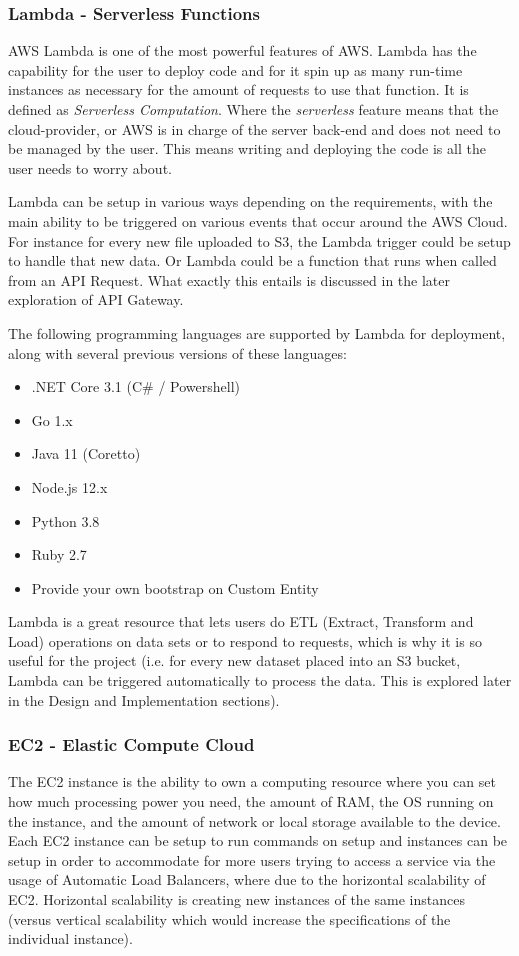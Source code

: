 \subsubsection{Lambda - Serverless Functions}
AWS Lambda is one of the most powerful features of AWS. Lambda has the capability for the user to deploy code and for it spin up as many run-time instances as necessary for the amount of requests to use that function. It is defined as \textit{Serverless Computation}. Where the \textit{serverless} feature means that the cloud-provider, or AWS is in charge of the server back-end and does not need to be managed by the user. This means writing and deploying the code is all the user needs to worry about. 

Lambda can be setup in various ways depending on the requirements, with the main ability to be triggered on various events that occur around the AWS Cloud. For instance for every new file uploaded to S3, the Lambda trigger could be setup to handle that new data. Or Lambda could be a function that runs when called from an API Request. What exactly this entails is discussed in the later exploration of API Gateway. 

The following programming languages are supported by Lambda for deployment, along with several previous versions of these languages:
\begin{itemize}
    \item .NET Core 3.1 (C\# / Powershell)
    \item Go 1.x
    \item Java 11 (Coretto)
    \item Node.js 12.x
    \item Python 3.8
    \item Ruby 2.7
    \item Provide your own bootstrap on Custom Entity
\end{itemize}
Lambda is a great resource that lets users do ETL (Extract, Transform and Load) operations on data sets or to respond to requests, which is why it is so useful for the project (i.e. for every new dataset placed into an S3 bucket, Lambda can be triggered automatically to process the data. This is explored later in the Design and Implementation sections).

\subsubsection{EC2 - Elastic Compute Cloud}
The EC2 instance is the ability to own a computing resource where you can set how much processing power you need, the amount of RAM, the OS running on the instance, and the amount of network or local storage available to the device. Each EC2 instance can be setup to run commands on setup and instances can be setup in order to accommodate for more users trying to access a service via the usage of Automatic Load Balancers, where due to the horizontal scalability of EC2. Horizontal scalability is creating new instances of the same instances (versus vertical scalability which would increase the specifications of the individual instance).
